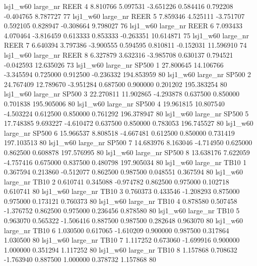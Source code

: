     lsj1_w60   large_nr     REER                 4  8.810766  5.097531  -3.651226 0.584416 0.792208 -0.404765    8.787727 77
    lsj1_w60   large_nr     REER                 5  7.859346  4.525111  -3.751707 0.592105 0.828947 -0.308664    9.798027 76
    lsj1_w60   large_nr     REER                 6  7.093433  4.070464  -3.816459 0.613333 0.853333 -0.263351   10.614871 75
    lsj1_w60   large_nr     REER                 7  6.640394  3.797386  -3.900555 0.594595 0.810811 -0.152031   11.596910 74
    lsj1_w60   large_nr     REER                 8  6.327879  3.632316  -3.985708 0.630137 0.794521 -0.042593   12.635026 73
    lsj1_w60   large_nr    SP500                 1 27.800645 14.106766  -3.345594 0.725000 0.912500 -0.236332  194.853959 80
    lsj1_w60   large_nr    SP500                 2 24.767409 12.789670  -3.951284 0.687500 0.900000  0.201202  195.383254 80
    lsj1_w60   large_nr    SP500                 3 22.270811 11.902865  -4.293878 0.637500 0.850000  0.701838  195.905006 80
    lsj1_w60   large_nr    SP500                 4 19.961815 10.807540  -4.503224 0.612500 0.850000  0.761292  196.378947 80
    lsj1_w60   large_nr    SP500                 5 17.748385  9.693227  -4.610472 0.637500 0.850000  0.783053  196.745527 80
    lsj1_w60   large_nr    SP500                 6 15.966537  8.808518  -4.667481 0.612500 0.850000  0.731419  197.103513 80
    lsj1_w60   large_nr    SP500                 7 14.683976  8.163046  -4.714950 0.625000 0.862500  0.608878  197.576995 80
    lsj1_w60   large_nr    SP500                 8 13.638176  7.622059  -4.757416 0.675000 0.837500  0.480798  197.905034 80
    lsj1_w60   large_nr     TB10                 1  0.367594  0.213860  -0.512077 0.862500 0.987500  0.048551    0.367594 80
    lsj1_w60   large_nr     TB10                 2  0.610741  0.345088  -0.974782 0.862500 0.975000  0.102718    0.610741 80
    lsj1_w60   large_nr     TB10                 3  0.760373  0.433546  -1.208293 0.875000 0.975000  0.173121    0.760373 80
    lsj1_w60   large_nr     TB10                 4  0.878580  0.507458  -1.376752 0.862500 0.975000  0.236456    0.878580 80
    lsj1_w60   large_nr     TB10                 5  0.963070  0.565322  -1.506416 0.887500 0.987500  0.282648    0.963070 80
    lsj1_w60   large_nr     TB10                 6  1.030500  0.617065  -1.610209 0.900000 0.987500  0.317864    1.030500 80
    lsj1_w60   large_nr     TB10                 7  1.117252  0.673060  -1.699916 0.900000 1.000000  0.351294    1.117252 80
    lsj1_w60   large_nr     TB10                 8  1.157868  0.708632  -1.763940 0.887500 1.000000  0.378732    1.157868 80
